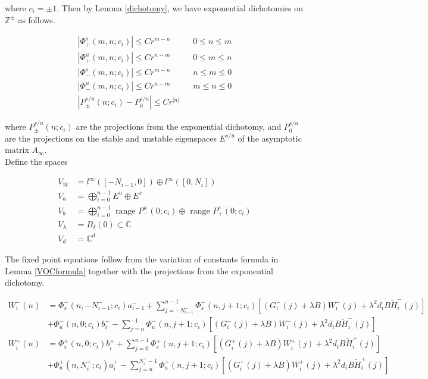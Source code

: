 \documentclass[12pt]{article}
\def\C{{\mathbb C}}
\def\Z{{\mathbb Z}}
\begin{document}
where $c_i = \pm 1$. Then by Lemma \ref{dichotomy}, we have exponential dichotomies on $\Z^\pm$ as follows.

\begin{align*}
|\Phi_+^s(m, n; c_i)| \leq C r^{m - n} && 0 \leq n \leq m \\
|\Phi_+^u(m, n; c_i)| \leq C r^{n - m} && 0 \leq m \leq n \\
|\Phi_-^s(m, n; c_i)| \leq C r^{m - n} && n \leq m \leq 0 \\
|\Phi_-^u(m, n; c_i)| \leq C r^{n - m} && m \leq n \leq 0 \\
|P_\pm^{s/u}(n; c_i) - P_0^{s/u}| \leq C r^{|n|}
\end{align*}

where $P_\pm^{s/u}(n; c_i)$ are the projections from the exponential dichotomy, and $P_0^{s/u}$ are the projections on the stable and unstable eigenspaces $E^{s/u}$ of the asymptotic matrix $A_\infty$.\\

Define the spaces

\begin{align*}
V_W &= l^\infty([-N_{i-1}, 0]) \oplus l^\infty([0, N_i])  \\
V_a &= \bigoplus_{i=0}^{n-1} E^u \oplus E^s \\
V_b &= \bigoplus_{i=0}^{n-1} 
\text{ range } P_-^u(0; c_i) \oplus \text{ range } P_+^s(0; c_i)\\
V_\lambda &= B_\delta(0) \subset \C \\
V_d &= \C^d
\end{align*}

The fixed point equations follow from the variation of constants formula in Lemma \ref{VOCformula} together with the projections from the exponential dichotomy.

\begin{align*}
W_i^-(n) &= 
\Phi_s^-(n, -N_{i-1}^-; c_i) a_{i-1}^- + \sum_{j = -N_{i-1}^-}^{n-1} \Phi_s^-(n, j+1; c_i)
[(G_i^-(j) + \lambda B) W_i^-(j) + \lambda^2 d_i B \tilde{H}_i^-(j)]
 \\
&+ \Phi_u^-(n, 0; c_i) b_i^- - \sum_{j = n}^{-1} \Phi_u^-(n, j+1; c_i) 
[(G_i^-(j) + \lambda B) W_i^-(j) + \lambda^2 d_i B \tilde{H}_i^-(j)] \\
W_i^+(n) &= \Phi_s^+(n, 0; c_i) b_i^+ + \sum_{j = 0}^{n-1} \Phi_s^+(n, j+1; c_i) 
[(G_i^+(j) + \lambda B) W_i^+(j) + \lambda^2 d_i B \tilde{H}_i^+(j)] \\
&+ \Phi_u^+(n, N_i^+; c_i) a_i^+ - \sum_{j = n}^{N_i^+-1} \Phi_u^+(n, j+1; c_i) 
[(G_i^+(j) + \lambda B) W_i^+(j) + \lambda^2 d_i B \tilde{H}_i^+(j)]
\end{align*}
\end{document}
